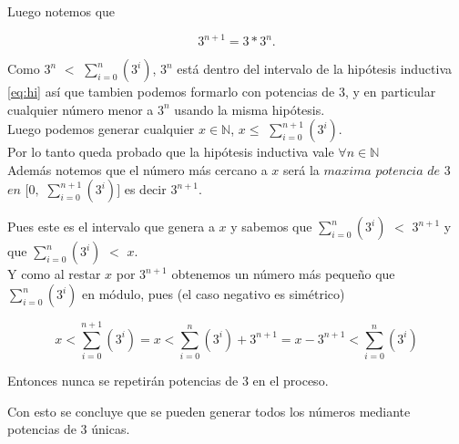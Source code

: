 Luego notemos que 

\begin{equation}
3^{n+1} = 3 \ast 3^n. 
\end{equation}

Como $3^n$ $<$ $\sum_{i=0}^{n}(3^i)$, $3^n$ está dentro del intervalo de la hipótesis inductiva \eqref{eq:hi} así que tambien podemos formarlo con potencias de 3, y en particular cualquier número menor a $3^n$ usando la misma hipótesis. \\

Luego podemos generar cualquier $x \in \mathbb{N}$, $x \leq$ $\sum_{i=0}^{n+1}(3^i)$. \\

Por lo tanto queda probado que la hipótesis inductiva vale $\forall n \in \mathbb{N}$ \\

Además notemos que el número más cercano a $x$ será la $maxima$ $potencia$ $de$ $3$ $en$ $[0, $ $\sum_{i=0}^{n+1}(3^i)]$ es decir $3^{n+1}$.
 
Pues este es el intervalo que genera a $x$ y sabemos que $\sum_{i=0}^{n}(3^i)$ $<$ $3^{n+1}$ y que
$\sum_{i=0}^{n}(3^i)$ $<$ $x$.\\

Y como al restar $x$ por $3^{n+1}$ obtenemos un número más pequeño que $\sum_{i=0}^{n}(3^i)$ en módulo, pues (el caso negativo es simétrico)

\begin{equation}
x < \sum_{i=0}^{n+1}(3^i) =
x < \sum_{i=0}^{n}(3^i) + 3^{n+1} =
x - 3^{n+1} < \sum_{i=0}^{n}(3^i) 
\end{equation}

Entonces nunca se repetir\'an potencias de 3 en el proceso.

Con esto se concluye que se pueden generar todos los números mediante potencias de 3 únicas.